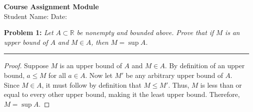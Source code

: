 \documentclass[11pt]{article}
\newenvironment{problem}[2]{%
    \vspace{1.5em}
    \noindent\textbf{\color{academicblue}Problem #1:} \textit{#2}\par\medskip
    \hrule\vspace{0.5em}
}{%
    \vspace{1.5em}
}
\begin{document}
\thispagestyle{plain}
\begin{center}
    {\LARGE \bfseries \color{academicblue} Course Assignment Module} \\
    \vspace{0.5em}
    {\large Student Name: \underline{\hspace{5cm}}} \quad Date: \underline{\hspace{3cm}}
\end{center}
\vspace{1.5em}

\begin{problem}{1}{Let $A \subset \mathbb{R}$ be nonempty and bounded above. Prove that if $M$ is an upper bound of $A$ and $M \in A$, then $M = \sup A$.}
\begin{proof}
    Suppose $M$ is an upper bound of $A$ and $M \in A$. 
    By definition of an upper bound, $a \le M$ for all $a \in A$.
    Now let $M'$ be any arbitrary upper bound of $A$. 
    Since $M \in A$, it must follow by definition that $M \le M'$.
    Thus, $M$ is less than or equal to every other upper bound, making it the least upper bound.
    Therefore, $M = \sup A$.
\end{proof}
\end{problem}
\end{document}
